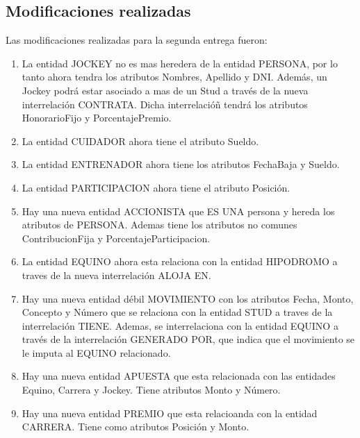 \documentclass[a4paper,11pt]{article}
\begin{document}
\subsection{Modificaciones realizadas}

Las modificaciones realizadas para la segunda entrega fueron:

\begin{enumerate}

  \item La entidad JOCKEY no es mas heredera de la entidad PERSONA, por lo tanto
	ahora tendra los atributos Nombres, Apellido y DNI. Además, un Jockey podrá
	estar asociado a mas de un Stud a través de la nueva interrelación CONTRATA.
  Dicha interrelacióñ tendrá los atributos HonorarioFijo y PorcentajePremio. 

  \item La entidad CUIDADOR ahora tiene el atributo Sueldo.

  \item La entidad ENTRENADOR ahora tiene los atributos FechaBaja y Sueldo. 

  \item La entidad PARTICIPACION ahora tiene el atributo Posición.

  \item Hay una nueva entidad ACCIONISTA que ES UNA persona y hereda los atributos
	de PERSONA. Ademas tiene los atributos no comunes ContribucionFija y 
  PorcentajeParticipacion.
  
  \item La entidad EQUINO ahora esta relaciona con la entidad HIPODROMO a traves
    de la nueva interrelación ALOJA EN. 

  \item Hay una nueva entidad débil MOVIMIENTO con los atributos Fecha, Monto,
    Concepto y Número que se relaciona con la entidad STUD a traves de la interrelación
    TIENE. Ademas, se interrelaciona con la entidad EQUINO a través de la interrelación
    GENERADO POR, que indica que el movimiento se le imputa al EQUINO relacionado. 

  \item Hay una nueva entidad APUESTA que esta relacionada con las entidades Equino, 
    Carrera y Jockey. Tiene atributos Monto y Número. 

  \item Hay una nueva entidad PREMIO que esta relacioanda con la entidad
    CARRERA. Tiene como atributos Posición y Monto.

\end{enumerate}
\end{document}
